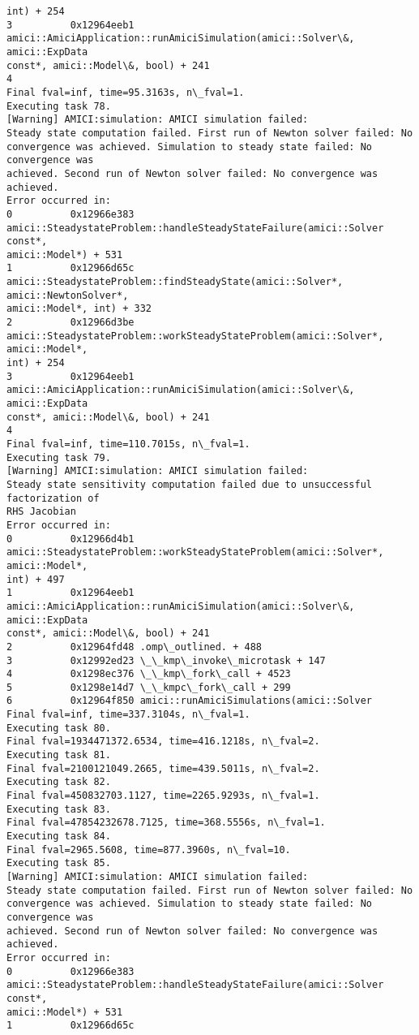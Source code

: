 \documentclass[11pt]{article}
\begin{document}
\begin{Verbatim}[commandchars=\\\{\}]
int) + 254
3          0x12964eeb1
amici::AmiciApplication::runAmiciSimulation(amici::Solver\&, amici::ExpData
const*, amici::Model\&, bool) + 241
4
Final fval=inf, time=95.3163s, n\_fval=1.
Executing task 78.
[Warning] AMICI:simulation: AMICI simulation failed:
Steady state computation failed. First run of Newton solver failed: No
convergence was achieved. Simulation to steady state failed: No convergence was
achieved. Second run of Newton solver failed: No convergence was achieved.
Error occurred in:
0          0x12966e383
amici::SteadystateProblem::handleSteadyStateFailure(amici::Solver const*,
amici::Model*) + 531
1          0x12966d65c
amici::SteadystateProblem::findSteadyState(amici::Solver*, amici::NewtonSolver*,
amici::Model*, int) + 332
2          0x12966d3be
amici::SteadystateProblem::workSteadyStateProblem(amici::Solver*, amici::Model*,
int) + 254
3          0x12964eeb1
amici::AmiciApplication::runAmiciSimulation(amici::Solver\&, amici::ExpData
const*, amici::Model\&, bool) + 241
4
Final fval=inf, time=110.7015s, n\_fval=1.
Executing task 79.
[Warning] AMICI:simulation: AMICI simulation failed:
Steady state sensitivity computation failed due to unsuccessful factorization of
RHS Jacobian
Error occurred in:
0          0x12966d4b1
amici::SteadystateProblem::workSteadyStateProblem(amici::Solver*, amici::Model*,
int) + 497
1          0x12964eeb1
amici::AmiciApplication::runAmiciSimulation(amici::Solver\&, amici::ExpData
const*, amici::Model\&, bool) + 241
2          0x12964fd48 .omp\_outlined. + 488
3          0x12992ed23 \_\_kmp\_invoke\_microtask + 147
4          0x1298ec376 \_\_kmp\_fork\_call + 4523
5          0x1298e14d7 \_\_kmpc\_fork\_call + 299
6          0x12964f850 amici::runAmiciSimulations(amici::Solver
Final fval=inf, time=337.3104s, n\_fval=1.
Executing task 80.
Final fval=1934471372.6534, time=416.1218s, n\_fval=2.
Executing task 81.
Final fval=2100121049.2665, time=439.5011s, n\_fval=2.
Executing task 82.
Final fval=450832703.1127, time=2265.9293s, n\_fval=1.
Executing task 83.
Final fval=47854232678.7125, time=368.5556s, n\_fval=1.
Executing task 84.
Final fval=2965.5608, time=877.3960s, n\_fval=10.
Executing task 85.
[Warning] AMICI:simulation: AMICI simulation failed:
Steady state computation failed. First run of Newton solver failed: No
convergence was achieved. Simulation to steady state failed: No convergence was
achieved. Second run of Newton solver failed: No convergence was achieved.
Error occurred in:
0          0x12966e383
amici::SteadystateProblem::handleSteadyStateFailure(amici::Solver const*,
amici::Model*) + 531
1          0x12966d65c

\end{Verbatim}
\end{document}
